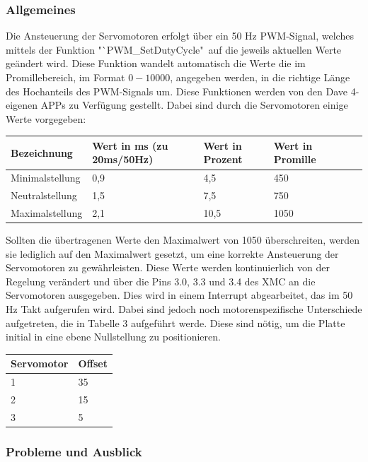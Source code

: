 \documentclass[12pt,a4paper,bibliography=totoc,listof=totoc]{scrartcl}
\begin{document}
\subsubsection{ Allgemeines}
Die Ansteuerung der Servomotoren erfolgt über ein 50 Hz PWM-Signal, welches mittels der Funktion 
"`PWM\_SetDutyCycle"\, auf die jeweils aktuellen Werte geändert wird. Diese Funktion wandelt automatisch 
die Werte die im Promillebereich, im Format $0-10000$, angegeben werden, in die richtige Länge des 
Hochanteils des PWM-Signals um. Diese Funktionen werden von den Dave 4- eigenen APPs zu Verfügung 
gestellt. Dabei sind durch die Servomotoren einige Werte vorgegeben:

\begin{tabularx}{\textwidth}{p{}|X|X|X|X|X|}
\hline
 Bezeichnung 		& Wert in ms (zu 20ms/50Hz) & Wert in Prozent 	& Wert in Promille \\
\hline
 Minimalstellung		& 0,9						& 4,5				& 450 \\
\hline
 Neutralstellung		& 1,5						& 7,5				& 750 \\
\hline
 Maximalstellung		&2,1						& 10,5				& 1050\\
\hline
\end{tabularx}
\newline
Sollten die übertragenen Werte den Maximalwert von 1050 überschreiten, werden sie lediglich auf den 
Maximalwert gesetzt, um eine korrekte Ansteuerung der Servomotoren zu gewährleisten. Diese Werte werden 
kontinuierlich von der Regelung verändert und über die Pins 3.0, 3.3 und 3.4 des XMC an die Servomotoren 
ausgegeben. Dies wird in einem Interrupt abgearbeitet, das im 50 Hz Takt aufgerufen wird. Dabei sind jedoch 
noch motorenspezifische Unterschiede aufgetreten, die in Tabelle 3 aufgeführt werde. Diese sind nötig, um 
die Platte initial in eine ebene Nullstellung zu positionieren.

\begin{tabularx}{4cm}{|l|l|}
\hline
 Servomotor		& Offset \\
\hline
 1				& 35	\\
\hline
 2				& 15\\
\hline
 3				& 5	\\
\hline
\end{tabularx}
\newline
\subsubsection{Probleme und Ausblick}
\end{document}
